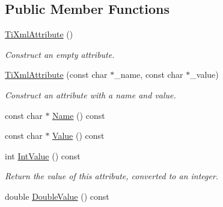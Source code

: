 \subsection*{\-Public \-Member \-Functions}
\begin{DoxyCompactItemize}
\item 
\hypertarget{class_ti_xml_attribute_a9cfa3c8179873fd485d83003b114f8e1}{
\hyperlink{class_ti_xml_attribute_a9cfa3c8179873fd485d83003b114f8e1}{\-Ti\-Xml\-Attribute} ()}
\label{class_ti_xml_attribute_a9cfa3c8179873fd485d83003b114f8e1}

\begin{DoxyCompactList}\small\item\em \-Construct an empty attribute. \end{DoxyCompactList}\item 
\hypertarget{class_ti_xml_attribute_a759d0b76fb8fcf765ecab243bc14f05e}{
\hyperlink{class_ti_xml_attribute_a759d0b76fb8fcf765ecab243bc14f05e}{\-Ti\-Xml\-Attribute} (const char $\ast$\-\_\-name, const char $\ast$\-\_\-value)}
\label{class_ti_xml_attribute_a759d0b76fb8fcf765ecab243bc14f05e}

\begin{DoxyCompactList}\small\item\em \-Construct an attribute with a name and value. \end{DoxyCompactList}\item 
const char $\ast$ \hyperlink{class_ti_xml_attribute_a298a57287d305904ba6bd96ae6f78d3d}{\-Name} () const 
\item 
const char $\ast$ \hyperlink{class_ti_xml_attribute_a0f874490eac8ca00ee0070765d0e97e3}{\-Value} () const 
\item 
\hypertarget{class_ti_xml_attribute_aa1a20ad59dc7e89a0ab265396360d50f}{
int \hyperlink{class_ti_xml_attribute_aa1a20ad59dc7e89a0ab265396360d50f}{\-Int\-Value} () const }
\label{class_ti_xml_attribute_aa1a20ad59dc7e89a0ab265396360d50f}

\begin{DoxyCompactList}\small\item\em \-Return the value of this attribute, converted to an integer. \end{DoxyCompactList}\item 
\hypertarget{class_ti_xml_attribute_a2880ddef53fc7522c99535273954d230}{
double \hyperlink{class_ti_xml_attribute_a2880ddef53fc7522c99535273954d230}{\-Double\-Value} () const }
\label{class_ti_xml_attribute_a2880ddef53fc7522c99535273954d230}


\end{DoxyCompactItemize}
